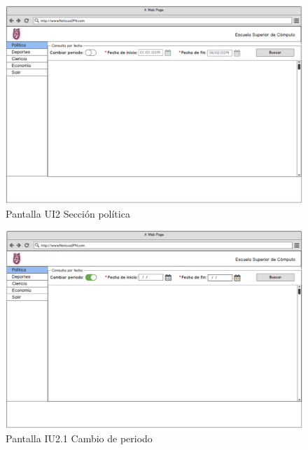 \begin{figure}[h]
  \centering 
	\includegraphics[scale=.35]{imagenes/Pantallas/UI2}
  \caption{Pantalla UI2 Sección política}
  \label{fig:UI2}
\end{figure}

\begin{figure}[h]
  \centering 
  \includegraphics[scale=.35]{imagenes/Pantallas/UI2_1}
  \caption{Pantalla IU2.1 Cambio de periodo}
  \label{fig:UI2_1}
\end{figure}

